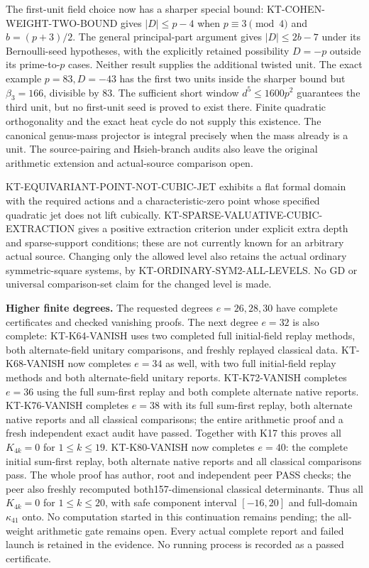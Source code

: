 \documentclass[11pt,a4paper]{article}
\theoremstyle{definition}
\renewcommand{\paragraph}[1]{\par\smallskip\noindent\textbf{#1}\quad\ignorespaces}
\begin{document}
The first-unit field choice now has a sharper special bound:
KT-COHEN-WEIGHT-TWO-BOUND gives $|D|\leq p-4$ when
$p\equiv3\pmod4$ and $b=(p+3)/2$.
The general principal-part argument gives $|D|\leq2b-7$
under its Bernoulli-seed hypotheses, with the explicitly
retained possibility $D=-p$ outside its prime-to-$p$ cases.
Neither result supplies the additional twisted unit.
The exact example $p=83,D=-43$ has the first two units
inside the sharper bound but $\beta_3=166$, divisible by $83$.
The sufficient short window $d^5\leq1600p^2$ guarantees
the third unit, but no first-unit seed is proved to exist there.
Finite quadratic orthogonality and the exact heat cycle do
not supply this existence. The canonical genus-mass projector
is integral precisely when the mass already is a unit.
The source-pairing and Hsieh-branch audits also leave the
original arithmetic extension and actual-source comparison open.

KT-EQUIVARIANT-POINT-NOT-CUBIC-JET exhibits a flat formal domain
with the required actions and a characteristic-zero point whose
specified quadratic jet does not lift cubically.
KT-SPARSE-VALUATIVE-CUBIC-EXTRACTION gives a positive extraction
criterion under explicit extra depth and sparse-support conditions;
these are not currently known for an arbitrary actual source.
Changing only the allowed level also retains the actual
ordinary symmetric-square systems, by
KT-ORDINARY-SYM2-ALL-LEVELS. No GD or universal comparison-set
claim for the changed level is made.

\paragraph{Higher finite degrees.}
The requested degrees $e=26,28,30$ have complete certificates and
checked vanishing proofs. The next degree $e=32$ is also complete:
KT-K64-VANISH uses two completed full initial-field replay methods,
both alternate-field unitary comparisons, and freshly replayed
classical data. KT-K68-VANISH now completes $e=34$ as well,
with two full initial-field replay methods and both alternate-field
unitary reports. KT-K72-VANISH completes $e=36$ using the full
sum-first replay and both complete alternate native reports.
KT-K76-VANISH completes $e=38$ with its full sum-first replay,
both alternate native reports and all classical comparisons;
the entire arithmetic proof and a fresh independent exact
audit have passed. Together with K17 this proves all $K_{4k}=0$
for $1\le k\le19$. KT-K80-VANISH now completes $e=40$:
the complete initial sum-first replay, both alternate native
reports and all classical comparisons pass. The whole proof
has author, root and independent peer PASS checks; the peer
also freshly recomputed both157-dimensional classical determinants.
Thus all $K_{4k}=0$ for $1\le k\le20$, with safe component
interval $[-16,20]$ and full-domain $\kappa_{41}$ onto.
No computation started in this continuation remains pending;
the all-weight arithmetic gate remains open.
Every actual complete report and failed launch is retained in the
evidence. No running process is recorded as a passed certificate.
\end{document}
